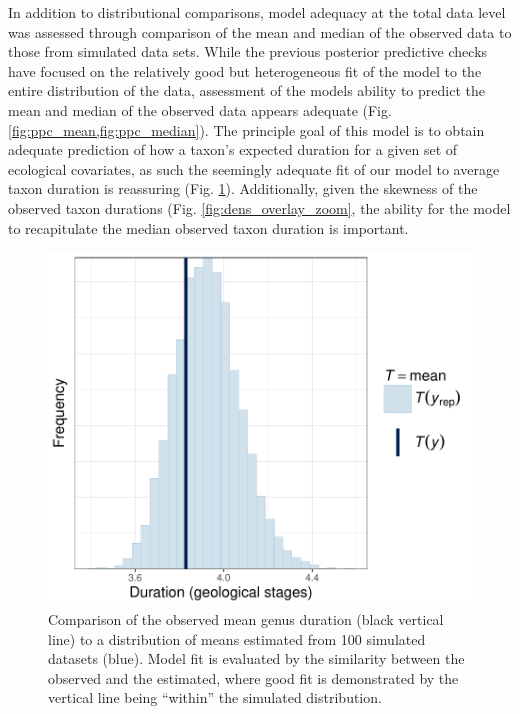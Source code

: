 \documentclass[11pt]{article}
\begin{document}
In addition to distributional comparisons, model adequacy at the total data level was assessed through comparison of the mean and median of the observed data to those from simulated data sets. While the previous posterior predictive checks have focused on the relatively good but heterogeneous fit of the model to the entire distribution of the data, assessment of the models ability to predict the mean and median of the observed data appears adequate (Fig. \ref{fig:ppc_mean,fig:ppc_median}). The principle goal of this model is to obtain adequate prediction of how a taxon's expected duration for a given set of ecological covariates, as such the seemingly adequate fit of our model to average taxon duration is reassuring (Fig. \ref{fig:ppc_mean}). Additionally, given the skewness of the observed taxon durations (Fig. \ref{fig:dens_overlay_zoom}, the ability for the model to recapitulate the median observed taxon duration is important.

\begin{figure}[ht]
  \centering
  \includegraphics[height = 0.5\textheight,width=\textwidth,keepaspectratio=true]{figure/ppc_mean_cweib_cens}
  \caption{ Comparison of the observed mean genus duration (black vertical line) to a distribution of means estimated from 100 simulated datasets (blue). Model fit is evaluated by the similarity between the observed and the estimated, where good fit is demonstrated by the vertical line being ``within'' the simulated distribution. }
  \label{fig:ppc_mean}
\end{figure}
\end{document}

